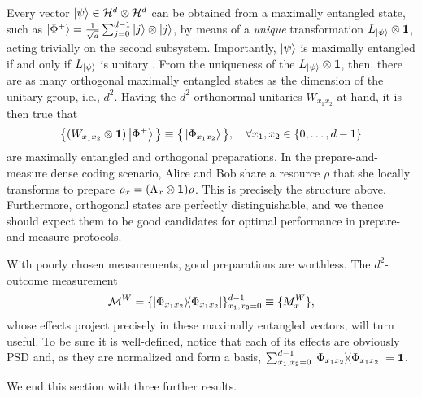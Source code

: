     Every vector $\ket{\psi} \in \mathcal{H}^{d} \otimes \mathcal{H}^{d}$ can be obtained from a maximally entangled state, such as $\ket{\Phi^+} = \frac{1}{\sqrt{d}} \sum_{j=0}^{d-1} \ket{j} \otimes \ket{j}$, by means of a \emph{unique} transformation $L_{\ket{\psi}} \otimes \mathbf{1}$, acting trivially on the second subsystem. Importantly, $\ket{\psi}$ is maximally entangled if and only if $L_{\ket{\psi}}$ is unitary \cite{vollbrecht_twoqubits_2000}. From the uniqueness of the $L_{\ket{\psi}} \otimes \mathbf{1}$, then, there are as many orthogonal maximally entangled states as the dimension of the unitary group, i.e., $d^2$. Having the $d^2$ orthonormal unitaries $W_{x_1 x_2}$ at hand, it is then true that
    \begin{equation}
        \big\{ (W_{x_1 x_2} \otimes \mathbf{1}) \ket{\Phi^+} \big\} \equiv \big\{ \ket{\Phi_{x_1 x_2}} \big\}, \quad \forall x_1, x_2 \in \{0, \ldots, d-1\}
        \label{eq:weyl-states}
    \end{equation}
    are maximally entangled and orthogonal preparations. In the prepare-and-measure dense coding scenario, Alice and Bob share a resource $\rho$ that she locally transforms to prepare $\rho_x = (\Lambda_x \otimes \mathbf{1}) \rho$. This is precisely the structure above. Furthermore, orthogonal states are perfectly distinguishable, and we thence should expect them to be good candidates for optimal performance in prepare-and-measure protocols.

    With poorly chosen measurements, good preparations are worthless. The $d^2$-outcome measurement
    \begin{equation}
        \mathcal{M}^W = \{ \ketbra{\Phi_{x_1 x_2}}{\Phi_{x_1 x_2}} \}_{x_1, x_2 = 0}^{d-1} \equiv \{ M_x^W \},
        \label{eq:weyl-measurements}
    \end{equation}
    whose effects project precisely in these maximally entangled vectors, will turn useful. To be sure it is well-defined, notice that each of its effects are obviously PSD and, as they are normalized and form a basis, $\sum_{x_1, x_2 = 0}^{d - 1} \ketbra{\Phi_{x_1 x_2}}{\Phi_{x_1 x_2}} = \mathbf{1}$.

    \ornamentbreak
    We end this section with three further results.


